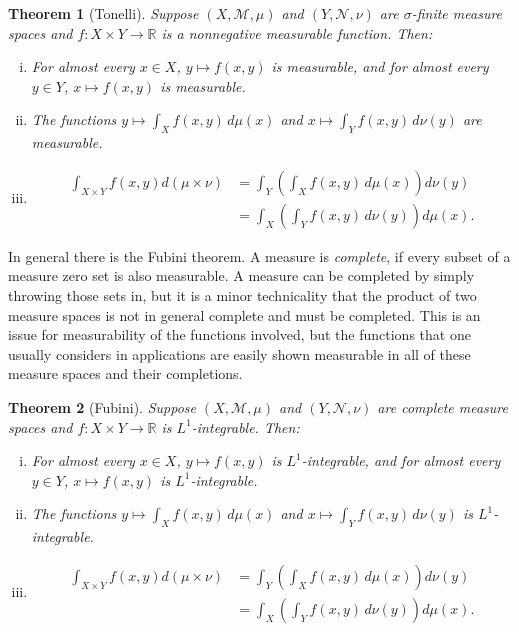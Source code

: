 \documentclass[12pt,openany]{book}
\newcommand{\R}{{\mathbb{R}}}
\newcommand{\sM}{{\mathscr{M}}}
\newcommand{\sN}{{\mathscr{N}}}
\theoremstyle{plain}
\newtheorem{thm}{Theorem}[section]
\theoremstyle{remark}
\theoremstyle{definition}
\theoremstyle{exercise}
\theoremstyle{example}
\begin{document}
\begin{thm}[Tonelli]
Suppose $(X,\sM,\mu)$ and $(Y,\sN,\nu)$ are $\sigma$-finite measure spaces
and $f \colon X \times Y \to \R$ is a nonnegative measurable function.
Then:
\begin{enumerate}[(i)]
\item For almost every $x \in X$, $y \mapsto f(x,y)$ is measurable, and
for almost every $y \in Y$, $x \mapsto f(x,y)$ is measurable.
\item The functions $y \mapsto \int_X f(x,y) \, d\mu(x)$ and $x \mapsto
\int_Y f(x,y) \, d\nu(y)$ are measurable.
\item
\begin{equation*}
\begin{split}
\int_{X \times Y} f(x,y) d(\mu\times \nu)
& =
\int_Y \left( \int_X f(x,y) \, d\mu(x) \right) d\nu(y)
\\
& =
\int_X \left( \int_Y f(x,y) \, d\nu(y) \right) d\mu(x) .
\end{split}
\end{equation*}
\end{enumerate}
\end{thm}

In general there is the Fubini theorem.  A measure is
\emph{complete}, if every subset of a measure zero
set is also measurable.  A measure can be completed by simply throwing
those sets in, but it is a minor technicality that the product of two
measure spaces is not in general complete and must be completed.  This is an
issue for measurability of the functions involved, but the functions that
one usually considers in applications are easily shown
measurable in all of these measure spaces and their completions.

\begin{thm}[Fubini]
Suppose $(X,\sM,\mu)$ and $(Y,\sN,\nu)$ are complete measure spaces
and $f \colon X \times Y \to \R$ is $L^1$-integrable.
Then:
\begin{enumerate}[(i)]
\item For almost every $x \in X$, $y \mapsto f(x,y)$ is $L^1$-integrable,
and for almost every $y \in Y$, $x \mapsto f(x,y)$ is $L^1$-integrable.
\item The functions $y \mapsto \int_X f(x,y) \, d\mu(x)$ and
$x \mapsto \int_Y f(x,y) \, d\nu(y)$ is $L^1$-integrable.
\item
\begin{equation*}
\begin{split}
\int_{X \times Y} f(x,y) d(\mu\times \nu)
& =
\int_Y \left( \int_X f(x,y) \, d\mu(x) \right) d\nu(y)
\\
& =
\int_X \left( \int_Y f(x,y) \, d\nu(y) \right) d\mu(x) .
\end{split}
\end{equation*}
\end{enumerate}
\end{thm}
\end{document}
